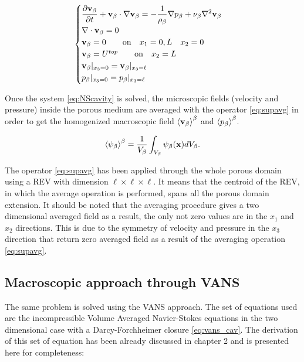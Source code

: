 
\begin{eqnarray}
\begin{cases}
\dfrac{\partial \textbf{v}_{\beta}}{\partial t} + \textbf{v}_{\beta} \cdot \nabla \textbf{v}_{\beta} = -\displaystyle\frac{1}{\rho_{\beta}} \nabla p_{\beta} + \nu_{\beta} \nabla^2  \textbf{v}_{\beta} \\
\nabla \cdot \textbf{v}_{\beta} = 0\\
\textbf{v}_{\beta} = 0 \qquad \text{on} \quad x_1 = 0,L \quad x_2 = 0 \\
\textbf{v}_{\beta} = U^{top} \qquad \text{on} \quad x_2 = L\\
\textbf{v}_{\beta}|_{x_3 = 0} = \textbf{v}_{\beta}|_{x_3 = \ell}  \\
p_{\beta}|_{x_3 = 0} = p_{\beta}|_{x_3 = \ell}
\end{cases}
\label{eq:NScavity}
\end{eqnarray}

Once the system \eqref{eq:NScavity} is solved, the microscopic fields (velocity and pressure) inside the porous medium are averaged with the operator \ref{eq:supavg} in order to get the homogenized macroscopic field ${\left< \textbf{v}_{\beta} \right>}^{\beta}$ and ${\left< p_{\beta} \right>}^{\beta}$.

\begin{equation}
	{\left< \psi_{\beta} \right>}^{\beta} = \dfrac{1}{V_\beta} \int_{V_\beta} \psi_\beta (\mathbf{x}) d V_\beta.
	\label{eq:supavg}
\end{equation}

The operator \eqref{eq:supavg} has been applied through the whole porous domain using a REV with dimension $\ell \times \ell \times \ell$.
It means that the centroid of the REV, in which the average operation is performed, spans all the porous domain extension.
It should be noted that the averaging procedure gives a two dimensional averaged field as a result, the only not zero values are in the $x_1$ and $x_2$ directions. This is due to the symmetry of velocity and pressure in the $x_3$ direction that return zero averaged field as a result of the averaging operation \eqref{eq:supavg}.

\subsection{Macroscopic approach through VANS}

The same problem is solved using the VANS approach.
The set of equations used are the incompressible Volume Averaged Navier-Stokes equations in the two dimensional case with a Darcy-Forchheimer closure \eqref{eq:vans_cav}.
The derivation of this set of equation has been already discussed in chapter 2 and is presented here for completeness:

